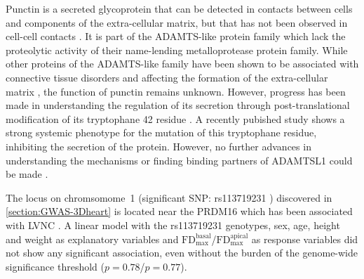 Punctin is a secreted glycoprotein that can be detected in contacts between cells and components of the extra-cellular matrix, but that has not been observed in cell-cell contacts \citep{Hirohata2002}. It is part of the ADAMTS-like protein family which lack the proteolytic activity of their name-lending metalloprotease protein family. While other proteins of the ADAMTS-like family have been shown to be associated with connective tissue disorders and affecting the formation of the extra-cellular matrix \citep{Ahram2009,Hubmacher2015}, the function of punctin remains unknown. However, progress has been made in understanding the regulation of its secretion through post-translational modification of its tryptophane \num{42} residue \citep{Wang2009}. A recently pubished study shows a strong systemic phenotype for the mutation of this tryptophane residue, inhibiting the secretion of the protein. However, no further advances in understanding the mechanisms or finding binding partners of ADAMTSL1 could be made \citep{Hendee2017}.

The locus on chromsomome~1 (significant SNP: rs113719231 ) discovered in \cref{section:GWAS-3Dheart} is located near the PRDM16 which has been associated with LVNC \citep{Arndt2013}. A linear model with the rs113719231 genotypes, sex, age, height and weight as explanatory variables and \(\text{FD}_\text{max}^\text{basal}\)/\(\text{FD}_\text{max}^\text{apical}\) as response variables did not show any significant association, even without the burden of the genome-wide significance threshold (\(p = 0.78\)/\(p = 0.77\)).

